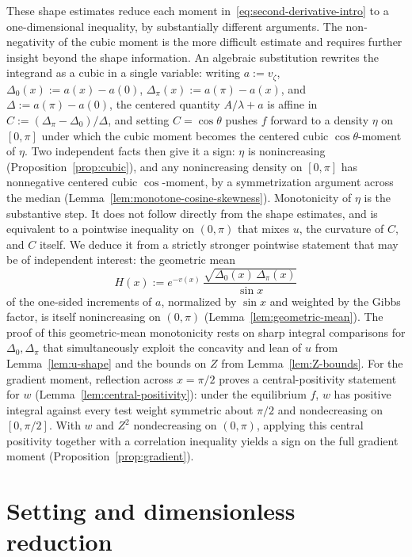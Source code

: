 \documentclass{amsart}
\begin{document}
These shape estimates reduce each moment
in~\eqref{eq:second-derivative-intro} to a one-dimensional inequality,
by substantially different arguments. The non-negativity of the cubic moment is the more difficult estimate and requires further insight beyond the shape information. An algebraic substitution rewrites the integrand as
a cubic in a single variable: writing $a:=v_\zeta$, $\Delta_0(x):=a(x)-a(0)$,
$\Delta_\pi(x):=a(\pi)-a(x)$, and $\Delta:=a(\pi)-a(0)$, the centered quantity
$A/\lambda+a$ is affine in $C:=(\Delta_\pi-\Delta_0)/\Delta$, and setting
$C=\cos\theta$ pushes $f$ forward to a density $\eta$ on $[0,\pi]$
under which the cubic moment becomes the centered cubic
$\cos\theta$-moment of $\eta$. Two independent facts then give it a sign:
$\eta$ is nonincreasing (Proposition~\ref{prop:cubic}), and any
nonincreasing density on $[0,\pi]$ has nonnegative centered cubic
$\cos$-moment, by a symmetrization argument across the median
(Lemma~\ref{lem:monotone-cosine-skewness}). Monotonicity of $\eta$ is
the substantive step. It does not follow directly from the shape
estimates, and is equivalent to a pointwise inequality on
$(0,\pi)$ that mixes $u$, the curvature of $C$, and $C$ itself. We
deduce it from a strictly stronger pointwise statement that may be of
independent interest: the geometric mean
\[
H(x):=e^{-v(x)}\,\frac{\sqrt{\Delta_0(x)\,\Delta_\pi(x)}}{\sin x}
\]
of the one-sided increments of $a$, normalized by $\sin x$ and
weighted by the Gibbs factor, is itself nonincreasing on $(0,\pi)$
(Lemma~\ref{lem:geometric-mean}).
The proof of this geometric-mean monotonicity rests on sharp integral
comparisons for $\Delta_0,\Delta_\pi$ that simultaneously exploit the concavity and
lean of $u$ from Lemma~\ref{lem:u-shape} and the bounds on $Z$ from
Lemma~\ref{lem:Z-bounds}. For the gradient
moment, reflection across $x=\pi/2$ proves a central-positivity
statement for $w$ (Lemma~\ref{lem:central-positivity}): under the
equilibrium $f$, $w$ has positive integral against every test weight
 symmetric about $\pi/2$ and nondecreasing on $[0,\pi/2]$. With
$w$ and $Z^2$ nondecreasing on $(0,\pi)$, applying this central
positivity together with a correlation
inequality yields a sign on the full gradient moment
(Proposition~\ref{prop:gradient}).

\section{Setting and dimensionless reduction}\label{sec:setup}
\end{document}
